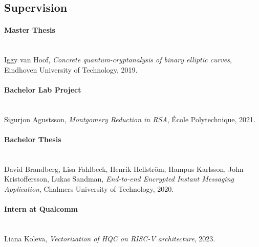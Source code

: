 \subsection*{Supervision}
\paragraph{Master Thesis}
~\\
Iggy van Hoof, \textit{Concrete quantum-cryptanalysis of binary elliptic curves}, Eindhoven University of Technology, 2019.
\paragraph{Bachelor Lab Project}
~\\
Sigurjon Agustsson, \textit{Montgomery Reduction in RSA}, École Polytechnique, 2021.
\paragraph{Bachelor Thesis}
~\\
David Brandberg, Lisa Fahlbeck, Henrik Hellstr\"om, Hampus Karlsson, John Kristoffersson, Lukas Sandman, \textit{End-to-end Encrypted Instant Messaging Application}, Chalmers University of Technology, 2020.

\paragraph{Intern at Qualcomm} 
~\\
Liana Koleva, \textit{Vectorization of HQC on RISC-V architecture}, 2023. 


